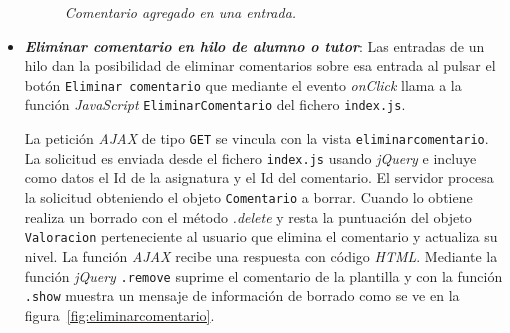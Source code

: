 \documentclass[a4paper, 12pt]{book}
\begin{document}
\begin{itemize}
  \begin{figure}
    \centering
    \caption{\textit{Comentario agregado en una entrada.}}
    \label{fig:agregarcomentario}
  \end{figure}
  
  \item {\bfseries \textit{Eliminar comentario en hilo de alumno o tutor}}: Las entradas de un hilo dan la posibilidad de eliminar comentarios sobre esa 
  entrada al pulsar el bot\'on \texttt{Eliminar comentario} que mediante el evento \textit{onClick} llama a la funci\'on \textit{JavaScript} 
  \texttt{EliminarComentario} del fichero \texttt{index.js}.
  
  La petici\'on \textit{AJAX} de tipo \texttt{GET} se vincula con la vista \texttt{eliminarcomentario}. La solicitud es enviada desde el 
  fichero \texttt{index.js} usando \textit{jQuery} e incluye como datos el Id de la asignatura y el Id del comentario.
  El servidor procesa la solicitud obteniendo el objeto \texttt{Comentario} a borrar. Cuando lo obtiene realiza un borrado con el m\'etodo \textit{.delete} 
  y resta la puntuaci\'on del objeto \texttt{Valoracion} perteneciente al usuario que elimina el comentario y actualiza su nivel.
  La funci\'on \textit{AJAX} recibe una respuesta con c\'odigo \textit{HTML}. Mediante la funci\'on \textit{jQuery} \texttt{.remove} suprime el comentario de la 
  plantilla y con la funci\'on \texttt{.show} muestra un mensaje de informaci\'on de borrado como se ve en la figura~\ref{fig:eliminarcomentario}.
  

\end{itemize}
\end{document}
